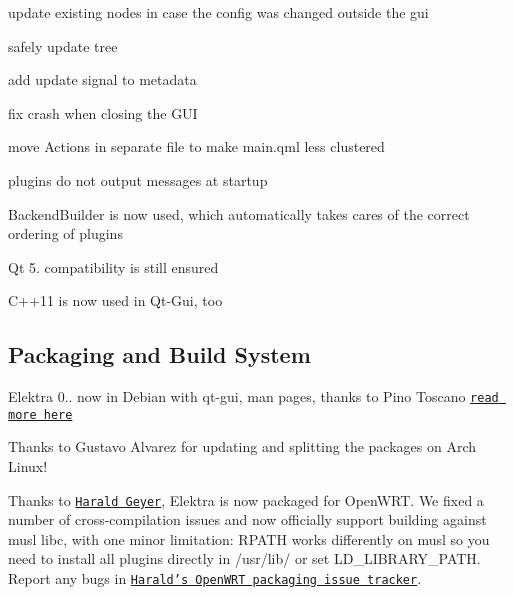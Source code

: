 \begin{DoxyItemize}
\item update existing nodes in case the config was changed outside the gui
\item safely update tree
\item add update signal to metadata
\item fix crash when closing the G\+U\+I
\item move Actions in separate file to make main.\+qml less clustered
\item plugins do not output messages at startup
\item {\ttfamily Backend\+Builder} is now used, which automatically takes cares of the correct ordering of plugins
\item Qt 5. compatibility is still ensured
\item C++11 is now used in Qt-\/\+Gui, too
\end{DoxyItemize}

\subsection*{Packaging and Build System}

Elektra 0.. now in Debian with qt-\/gui, man pages, thanks to Pino Toscano \href{https://packages.qa.debian.org/e/elektra/news/20151215T000031Z.html}{\tt read more here}

Thanks to Gustavo Alvarez for updating and splitting the packages on Arch Linux!

Thanks to \href{http://friends.ccbib.org/harald/supporting/}{\tt Harald Geyer}, Elektra is now packaged for Open\+W\+R\+T. We fixed a number of cross-\/compilation issues and now officially support building against musl libc, with one minor limitation\+: R\+P\+A\+T\+H works differently on musl so you need to install all plugins directly in /usr/lib/ or set L\+D\+\_\+\+L\+I\+B\+R\+A\+R\+Y\+\_\+\+P\+A\+T\+H. Report any bugs in \href{https://github.com/haraldg/packages}{\tt Harald's Open\+W\+R\+T packaging issue tracker}.



